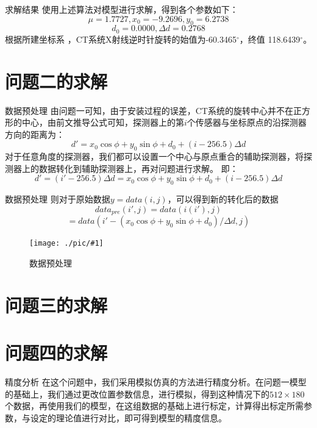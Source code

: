\documentclass{beamer}
\newcommand{\midpic}[2]{  \begin{figure}[H]
  \centering
  \texttt{[image: ./pic/\#1]}\\
  \caption{#2}
\end{figure}}
\begin{document}
  \begin{frame}{求解结果} 
    使用上述算法对模型进行求解，得到各个参数如下：
    \[\mu = 1.7727,x_0 = -9.2696,y_0 = 6.2738\]
    \[d_0 = 0.0000,\Delta d = 0.2768\]
    根据所建坐标系 ，CT系统X射线逆时针旋转的始值为-60.3465$^\circ$，终值 118.6439$^\circ$。
  \end{frame}
  
  \section{问题二的求解}
  \begin{frame}{数据预处理}
    由问题一可知，由于安装过程的误差，CT系统的旋转中心并不在正方形的中心，由前文推导公式可知，探测器上的第\(i\)个传感器与坐标原点的沿探测器方向的距离为：
    \[d' = x_0\cos\phi + y_0\sin\phi + d_0 +  (i - 256.5)\Delta d\]
    对于任意角度的探测器，我们都可以设置一个中心与原点重合的辅助探测器，将探测器上的数据转化到辅助探测器上，再对问题进行求解。
    即：
    \[d' = (i' - 256.5)\Delta d = x_0\cos\phi + y_0\sin\phi + d_0 +  (i - 256.5)\Delta d\]
  \end{frame}

  \begin{frame}{数据预处理}
    则对于原始数据\( y = data(i,j)\)，可以得到新的转化后的数据
    \[data_{pre}(i',j) = data(i(i'),j)\]
    \[ = data(i' - (x_0\cos\phi + y_0\sin\phi + d_0)/\Delta d,j)\]
    \midpic{datapre3.png}{数据预处理}
  \end{frame}

  \section{问题三的求解}
  \section{问题四的求解}
  \begin{frame}{精度分析}
    在这个问题中，我们采用模拟仿真的方法进行精度分析。在问题一模型的基础上，我们通过更改位置参数信息，进行模拟，得到这种情况下的\(512\times180\)个数据，再使用我们的模型，在这组数据的基础上进行标定，计算得出标定所需参数，与设定的理论值进行对比，即可得到模型的精度信息。
  \end{frame}
\end{document}
